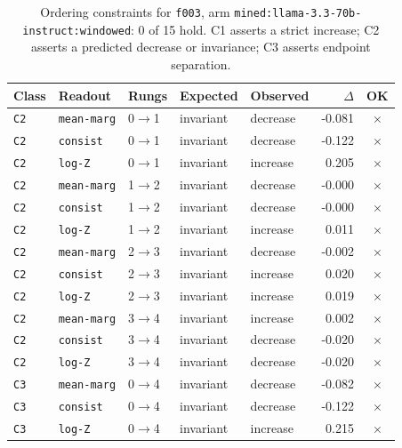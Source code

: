 \documentclass[11pt]{article}
\begin{document}
\begin{table}[htbp]
\centering
\small
\caption{Ordering constraints for \texttt{f003}, arm \texttt{mined:llama-3.3-70b-instruct:windowed}: 0 of 15 hold. C1 asserts a strict increase; C2 asserts a predicted decrease or invariance; C3 asserts endpoint separation.}
\label{tab:ladder-f003-mined-llama-3-3-70b-instruct-windowed}
\begin{tabular}{lllllrc}
\toprule
Class & Readout & Rungs & Expected & Observed & $\Delta$ & OK \\
\midrule
\texttt{C2} & \texttt{mean-marg} & 0$\to$1 & invariant & decrease & -0.081 & $\times$ \\
\texttt{C2} & \texttt{consist} & 0$\to$1 & invariant & decrease & -0.122 & $\times$ \\
\texttt{C2} & \texttt{log-Z} & 0$\to$1 & invariant & increase & 0.205 & $\times$ \\
\texttt{C2} & \texttt{mean-marg} & 1$\to$2 & invariant & decrease & -0.000 & $\times$ \\
\texttt{C2} & \texttt{consist} & 1$\to$2 & invariant & decrease & -0.000 & $\times$ \\
\texttt{C2} & \texttt{log-Z} & 1$\to$2 & invariant & increase & 0.011 & $\times$ \\
\texttt{C2} & \texttt{mean-marg} & 2$\to$3 & invariant & decrease & -0.002 & $\times$ \\
\texttt{C2} & \texttt{consist} & 2$\to$3 & invariant & increase & 0.020 & $\times$ \\
\texttt{C2} & \texttt{log-Z} & 2$\to$3 & invariant & increase & 0.019 & $\times$ \\
\texttt{C2} & \texttt{mean-marg} & 3$\to$4 & invariant & increase & 0.002 & $\times$ \\
\texttt{C2} & \texttt{consist} & 3$\to$4 & invariant & decrease & -0.020 & $\times$ \\
\texttt{C2} & \texttt{log-Z} & 3$\to$4 & invariant & decrease & -0.020 & $\times$ \\
\texttt{C3} & \texttt{mean-marg} & 0$\to$4 & invariant & decrease & -0.082 & $\times$ \\
\texttt{C3} & \texttt{consist} & 0$\to$4 & invariant & decrease & -0.122 & $\times$ \\
\texttt{C3} & \texttt{log-Z} & 0$\to$4 & invariant & increase & 0.215 & $\times$ \\
\bottomrule
\end{tabular}
\end{table}
\end{document}
